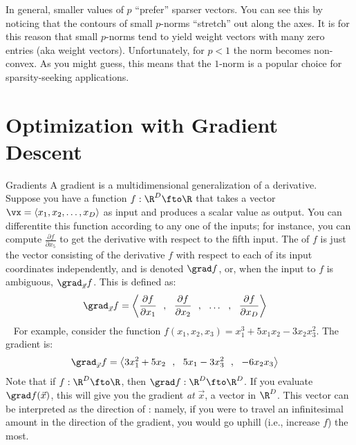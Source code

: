 
In general, smaller values of $p$ ``prefer'' sparser vectors.  You can
see this by noticing that the contours of small $p$-norms ``stretch''
out along the axes.  It is for this reason that small $p$-norms tend
to yield weight vectors with many zero entries (aka 
weight vectors).  Unfortunately, for $p<1$ the norm becomes
non-convex.  As you might guess, this means that the $1$-norm is a
popular choice for sparsity-seeking applications.

\section{Optimization with Gradient Descent}

\begin{mathreview}{Gradients}
  A gradient is a multidimensional generalization of a derivative.
  Suppose you have a function $f : \R^D \fto \R$ that takes a vector $\vx = \langle x_1, x_2, \dots, x_D \rangle$ as input and produces a scalar value as output.
  You can differentite this function according to any one of the inputs; for instance, you can compute $\frac {\partial f} {\partial x_5}$ to get the derivative with respect to the fifth input.
  The  of $f$ is just the vector consisting of the derivative $f$ with respect to each of its input coordinates independently, and is denoted $\grad f$, or, when the input to $f$ is ambiguous, $\grad_{\vec x} f$.
  This is defined as:
  ~
  \begin{align}
    \grad_{\vec x} f &= \left\langle \frac {\partial f} {\partial x_1}~~,~~ 
                                    \frac {\partial f} {\partial x_2}~~,~~ 
                                    \dots~~,~~
                                    \frac {\partial f} {\partial x_D} \right\rangle
  \end{align}
  ~
  For example, consider the function $f(x_1, x_2, x_3) = x_1^3 + 5 x_1 x_2 - 3 x_2 x_3^2$.
  The gradient is:
  ~
  \begin{align}
    \grad_{\vec x} f &= \left\langle
                       3 x_1^2 + 5 x_2~~,~~
                       5 x_1 - 3 x_3^2~~,~~
                       -6 x_2 x_3 \right\rangle
  \end{align}
  Note that if $f : \R^D \fto \R$, then $\grad f : \R^D \fto \R^D$.
  If you evaluate $\grad f(\vec x)$, this will give you the gradient \emph{at} $\vec x$, a vector in $\R^D$.
  This vector can be interpreted as the direction of : namely, if you were to travel an infinitesimal amount in the direction of the gradient, you would go uphill (i.e., increase $f$) the most.
\end{mathreview}

